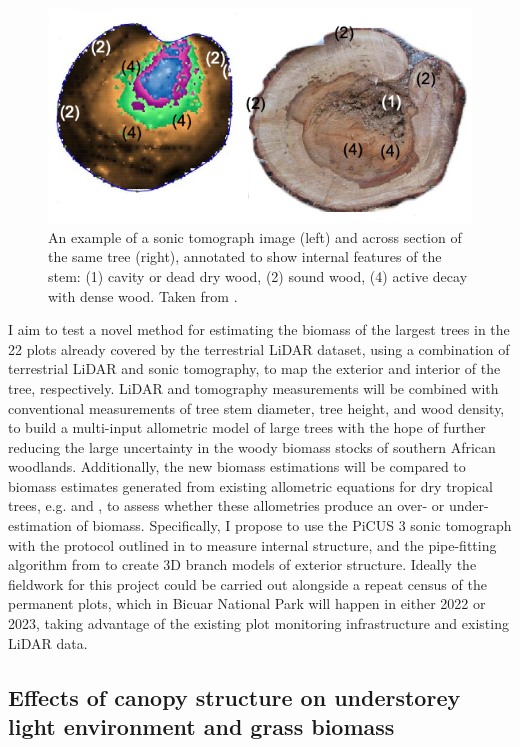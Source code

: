 \begin{refsection}
\begin{figure}[H]
\centering
	\includegraphics[width=\textwidth]{img/tomograph}
	\caption{An example of a sonic tomograph image (left) and across section of
		the same tree (right), annotated to show internal features of the stem:
		(1) cavity or dead dry wood, (2) sound wood, (4) active decay with dense
	wood. Taken from \citet{Picus2016}.}
	\label{tomograph}
\end{figure}

I aim to test a novel method for estimating the biomass of the largest trees in the 22 plots already covered by the terrestrial LiDAR dataset, using a combination of terrestrial LiDAR and sonic tomography, to map the exterior and interior of the tree, respectively. LiDAR and tomography measurements will be combined with conventional measurements of tree stem diameter, tree height, and wood density, to build a multi-input allometric model of large trees with the hope of further reducing the large uncertainty in the woody biomass stocks of southern African woodlands. Additionally, the new biomass estimations will be compared to biomass estimates generated from existing allometric equations for dry tropical trees, e.g. \citet{Chave2014} and \citet{Ryan2011}, to assess whether these allometries produce an over- or under-estimation of biomass. Specifically, I propose to use the PiCUS 3 sonic tomograph with the protocol outlined in \citet{Gilbert2016} to measure internal structure, and the pipe-fitting algorithm from \citet{Calders2014} to create 3D branch models of exterior structure. Ideally the fieldwork for this project could be carried out alongside a repeat census of the permanent plots, which in Bicuar National Park will happen in either 2022 or 2023, taking advantage of the existing plot monitoring infrastructure and existing LiDAR data.

\subsection{Effects of canopy structure on understorey light environment and grass biomass}


\end{refsection}
